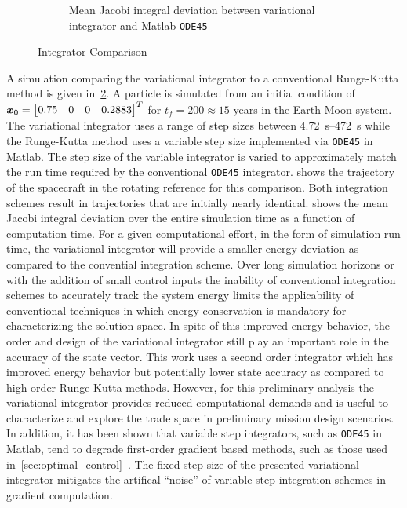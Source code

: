 \documentclass[smallcondensed]{svjour3}
\begin{document}
\begin{figure}
\begin{subfigure}[htbp]{0.5\textwidth}
                \caption{Mean Jacobi integral deviation between variational integrator and Matlab \texttt{ODE45}} \label{fig:compare_energy} 
        \end{subfigure} 
        \caption{Integrator Comparison}
        \label{fig:integrator_compare} 
\end{figure}
A simulation comparing the variational integrator to a conventional Runge-Kutta method is given in~\cref{fig:integrator_compare}.
A particle is simulated from an initial condition of \( \bm{x}_0 = \begin{bmatrix} 0.75 & 0 & 0 & 0.2883\end{bmatrix}^T \) for \( t_f = 200 \approx 15\) years in the Earth-Moon system.
    The variational integrator uses a range of step sizes between \SIrange{4.72}{472}{\second} while the Runge-Kutta method uses a variable step size implemented via \texttt{ODE45} in Matlab.
    The step size of the variable integrator is varied to approximately match the run time required by the conventional \texttt{ODE45} integrator.
 shows the trajectory of the spacecraft in the rotating reference for this comparison.
Both integration schemes result in trajectories that are initially nearly identical.
 shows the mean Jacobi integral deviation over the entire simulation time as a function of computation time.
For a given computational effort, in the form of simulation run time, the variational integrator will provide a smaller energy deviation as compared to the convential integration scheme.
Over long simulation horizons or with the addition of small control inputs the inability of conventional integration schemes to accurately track the system energy limits the applicability of conventional techniques in which energy conservation is mandatory for characterizing the solution space.
In spite of this improved energy behavior, the order and design of the variational integrator still play an important role in the accuracy of the state vector.
This work uses a second order integrator which has improved energy behavior but potentially lower state accuracy as compared to high order Runge Kutta methods. 
However, for this preliminary analysis the variational integrator provides reduced computational demands and is useful to characterize and explore the trade space in preliminary mission design scenarios.
In addition, it has been shown that variable step integrators, such as \texttt{ODE45} in Matlab, tend to degrade first-order gradient based methods, such as those used in~\cref{sec:optimal_control}~\cite{pellegrini2016}.
The fixed step size of the presented variational integrator mitigates the artifical ``noise'' of variable step integration schemes in gradient computation.
\end{document}
